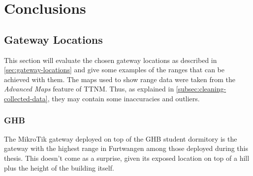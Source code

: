 \chapter{Conclusions}

\section{Gateway Locations}\label{sec:gateway-locations-conclusions}

This section will evaluate the chosen gateway locations as described in \cref{sec:gateway-locations} and give some examples of the ranges that can be achieved with them.
The maps used to show range data were taken from the \emph{Advanced Maps} feature of \ac{TTNM}.
Thus, as explained in \cref{subsec:cleaning-collected-data}, they may contain some inaccuracies and outliers.

\subsection{\acf{GHB}}\label{subsec:ghb-student-dormitory-range-results}

The MikroTik gateway deployed on top of the \ac{GHB} student dormitory is the gateway with the highest range in Furtwangen among those deployed during this thesis.
This doesn't come as a surprise, given its exposed location on top of a hill plus the height of the building itself.


